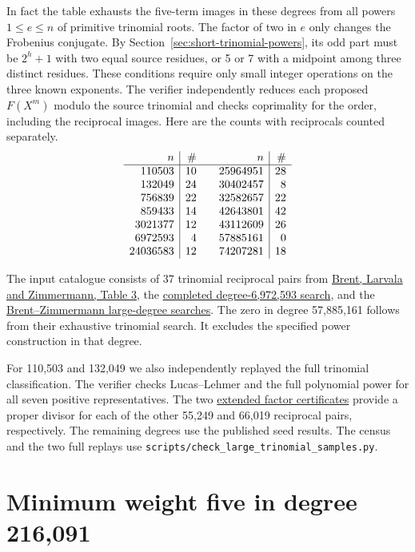 \documentclass[11pt]{article}
\begin{document}
In fact the table exhausts the five-term images in these degrees
from all powers \(1\le e\le n\) of primitive trinomial roots.
The factor of two in \(e\) only changes the Frobenius conjugate.
By Section~\ref{sec:short-trinomial-powers}, its odd part must be
\(2^h+1\) with two equal source residues, or 5 or 7 with a midpoint
among three distinct residues. These conditions require only small
integer operations on the three known exponents. The verifier
independently reduces each proposed \(F(X^m)\) modulo the source
trinomial and checks coprimality for the order, including the
reciprocal images. Here are the counts with reciprocals counted
separately.
\[
\begin{array}{r|r@{\qquad}r|r}
 n & \# & n & \# \\ \hline
 110503&10 &25964951&28\\
 132049&24 &30402457&8\\
 756839&22 &32582657&22\\
 859433&14 &42643801&42\\
 3021377&12 &43112609&26\\
 6972593&4 &57885161&0\\
 24036583&12 &74207281&18
\end{array}
\]

The input catalogue consists of 37 trinomial reciprocal pairs from
\href{https://maths-people.anu.edu.au/~brent/pd/rpb199.pdf}
{Brent, Larvala and Zimmermann, Table 3}, the
\href{https://maths-people.anu.edu.au/brent/trinom-old.html}
{completed degree-6,972,593 search}, and the
\href{https://maths-people.anu.edu.au/brent/trinom.html}
{Brent--Zimmermann large-degree searches}. The zero in degree
57,885,161 follows from their exhaustive trinomial search. It
excludes the specified power construction in that degree.

For 110,503 and 132,049 we also independently replayed the full
trinomial classification. The verifier checks Lucas--Lehmer and
the full polynomial power for all seven positive representatives.
The two \href{https://maths-people.anu.edu.au/~brent/trinomlg.html}
{extended factor certificates} provide a proper divisor for each
of the other 55,249 and 66,019 reciprocal pairs, respectively.
The remaining degrees use the published seed results. The census
and the two full replays use
\nolinkurl{scripts/check_large_trinomial_samples.py}.

\clearpage
\section{Minimum weight five in degree 216,091}
\label{sec:mersenne-216091}
\end{document}

